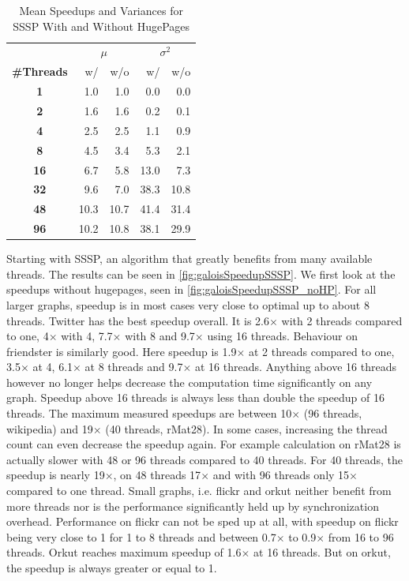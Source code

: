 \begin{table}
\renewcommand{\arraystretch}{1.3}
\centering
\caption{Mean Speedups and Variances for SSSP With and Without HugePages}
\label{tbl:ssspMeansVariances}
\begin{tabular}{c
r@{\tabskip 1 \tabcolsep}r
r@{\tabskip 1 \tabcolsep}r}
\toprule
&\multicolumn{2}{c}{\!\!\!$\mu$}&\multicolumn{2}{c}{\!\!$\sigma^2$}\\
\cmidrule(r){2-3}\cmidrule(r){4-5}
{\bf\#Threads}&w/&w/o&w/&w/o\\\midrule
\bf1 & 1.0 & 1.0 & 0.0 & 0.0 \\
\bf2 & 1.6 & 1.6 & 0.2 & 0.1 \\
\bf4 & 2.5 & 2.5 & 1.1 & 0.9 \\
\bf8 & 4.5 & 3.4 & 5.3 & 2.1 \\
\bf16 & 6.7 & 5.8 & 13.0 & 7.3 \\
\bf32 & 9.6 & 7.0 & 38.3 & 10.8 \\
\bf48 & 10.3 & 10.7 & 41.4 & 31.4 \\
\bf96 & 10.2 & 10.8 & 38.1 & 29.9 \\
\bottomrule
\end{tabular}
\end{table}

Starting with SSSP, an algorithm that greatly benefits from many available threads. The results can be seen in \autoref{fig:galoisSpeedupSSSP}.
We first look at the speedups without hugepages, seen in \autoref{fig:galoisSpeedupSSSP_noHP}.
For all larger graphs, speedup is in most cases very close to optimal up to about 8 threads.
Twitter has the best speedup overall. It is 2.6$\times$ with 2 threads compared to one, 4$\times$ with 4, 7.7$\times$ with 8 and 9.7$\times$ using 16 threads.
Behaviour on friendster is similarly good. Here speedup is 1.9$\times$ at 2 threads compared to one, 3.5$\times$ at 4, 6.1$\times$ at 8 threads and 9.7$\times$ at 16 threads.
Anything above 16 threads however no longer helps decrease the computation time significantly on any graph. Speedup above 16 threads is always less than double the speedup of 16 threads. The maximum measured speedups are between 10$\times$ (96 threads, wikipedia) and 19$\times$ (40 threads, rMat28).
In some cases, increasing the thread count can even decrease the speedup again. For example calculation on rMat28 is actually slower with 48 or 96 threads compared to 40 threads. For 40 threads, the speedup is nearly 19$\times$, on 48 threads 17$\times$ and with 96 threads only 15$\times$ compared to one thread.
Small graphs, i.e. flickr and orkut neither benefit from more threads nor is the performance significantly held up by synchronization overhead.
Performance on flickr can not be sped up at all, with speedup on flickr being very close to 1 for 1 to 8 threads and between 0.7$\times$ to 0.9$\times$ from 16 to 96 threads.
Orkut reaches maximum speedup of 1.6$\times$ at 16 threads. But on orkut, the speedup is always greater or equal to 1.

